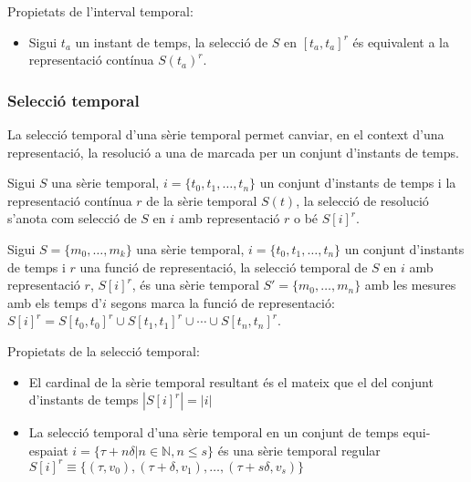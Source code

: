 Propietats de l'interval temporal:

\begin{itemize}
\item Sigui $t_a$ un instant de temps, la selecció de
  $S$ en $[t_a,t_a]^r$ és equivalent a la representació contínua
  $S(t_a)^r$. 
\end{itemize}




\subsubsection{Selecció temporal}


La selecció  temporal d'una sèrie temporal permet canviar, en el
context d'una representació, la resolució a una de marcada per un
conjunt d'instants de temps. 

Sigui $S$ una sèrie temporal, $i= \{t_0,t_1,\dotsc,t_n\}$ un conjunt
d'instants de temps i la representació contínua $r$ de la sèrie
temporal $S(t)$, la selecció de resolució s'anota com selecció de $S$
en $i$ amb representació $r$ o bé $S[i]^r$.


\begin{definition}
  Sigui $S=\{m_0, \ldots, m_k\}$ una sèrie temporal,
  $i=\{t_0,t_1,\dotsc,t_n\}$ un conjunt d'instants de temps i $r$ una
  funció de representació, la selecció temporal de $S$ en $i$ amb
  representació $r$, $S[i]^r$, és una sèrie temporal $S'=\{m_0, \ldots, m_n\}$
  amb les mesures amb els temps d'$i$ segons marca la funció de
  representació: $S[i]^r= S[t_0,t_0]^r \cup S[t_1,t_1]^r \cup \dotsb
  \cup S[t_n,t_n]^r$.
\end{definition}

Propietats de la selecció temporal:
\begin{itemize}

\item El cardinal de la sèrie temporal resultant és el mateix que el
  del conjunt d'instants de temps $|S[i]^r| = |i|$

\item La selecció temporal d'una sèrie temporal en un conjunt de temps
  equi-espaiat $i = \{\tau+n\delta | n\in\mathbb{N}, n\leq s \}$ és una
  sèrie temporal regular $S[i]^r \equiv \{ (\tau, v_0),
  (\tau+\delta,v_1), \dotsc , (\tau+s\delta,v_s)\}$
\end{itemize}




